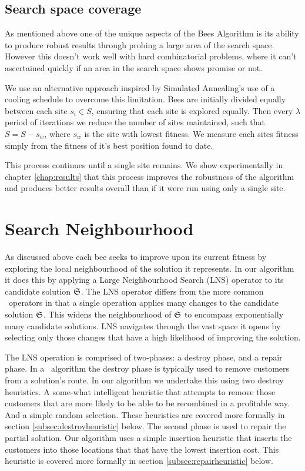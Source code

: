 
\subsection{Search space coverage}
\label{subsec:searchspacecoverage}

As mentioned above one of the unique aspects of the Bees Algorithm is its ability to produce robust results through probing a large area of the search space. However this doesn't work well with hard combinatorial problems, where it can't ascertained quickly if an area in the search space shows promise or not. 

We use an alternative approach inspired by Simulated Annealing's use of a cooling schedule to overcome this limitation. Bees are initially divided equally between each site $s_i \in S$, ensuring that each site is explored equally. Then every $\lambda$ period of iterations we reduce the number of sites maintained, such that $S = S - s_w$, where $s_w$ is the site with lowest fitness. We measure each sites fitness simply from the fitness of it's best position found to date.

This process continues until a single site remains. We show experimentally in chapter \ref{chap:results} that this process improves the robustness of the algorithm and produces better results overall than if it were run using only a single site. 

\section{Search Neighbourhood}
\label{sec:searchneighbourhood}

As discussed above each bee seeks to improve upon its current fitness by exploring the local neighbourhood of the solution it represents. In our algorithm it does this by applying a Large Neighbourhood Search (LNS) operator to its candidate solution $\mathfrak{S}$. The LNS operator differs from the more common \VRP\ operators in that a single operation applies many changes to the candidate solution $\mathfrak{S}$. This widens the neighbourhood of $\mathfrak{S}$ to encompass exponentially many candidate solutions. LNS navigates through the vast space it opens by selecting only those changes that have a high likelihood of improving the solution. 

The LNS operation is comprised of two-phases: a destroy phase, and a repair phase. In a \VRP\ algorithm the destroy phase is typically used to remove customers from a solution's route. In our algorithm we undertake this using two destroy heuristics. A some-what intelligent heuristic that attempts to remove those customers that are more likely to be able to be recombined in a profitable way. And a simple random selection. These heuristics are covered more formally in section \ref{subsec:destroyheuristic} below. The second phase is used to repair the partial solution. Our algorithm uses a simple insertion heuristic that inserts the customers into those locations that that have the lowest insertion cost. This heuristic is covered more formally in section \ref{subsec:repairheuristic} below.

